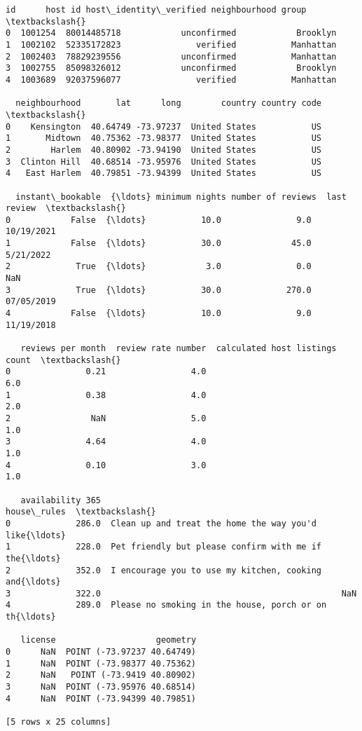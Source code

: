 \documentclass[11pt]{article}
\makeatletter
\newcommand{\boxspacing}{\kern\kvtcb@left@rule\kern\kvtcb@boxsep}
\newcommand{\prompt}[4]{
        {\ttfamily\llap{{\color{#2}[#3]:\hspace{3pt}#4}}\vspace{-\baselineskip}}
    }
\makeatother
\begin{document}
            \begin{tcolorbox}[breakable, size=fbox, boxrule=.5pt, pad at break*=1mm, opacityfill=0]
\prompt{Out}{outcolor}{12}{\boxspacing}
\begin{Verbatim}[commandchars=\\\{\}]
        id      host id host\_identity\_verified neighbourhood group  \textbackslash{}
0  1001254  80014485718            unconfirmed            Brooklyn
1  1002102  52335172823               verified           Manhattan
2  1002403  78829239556            unconfirmed           Manhattan
3  1002755  85098326012            unconfirmed            Brooklyn
4  1003689  92037596077               verified           Manhattan

  neighbourhood       lat      long        country country code  \textbackslash{}
0    Kensington  40.64749 -73.97237  United States           US
1       Midtown  40.75362 -73.98377  United States           US
2        Harlem  40.80902 -73.94190  United States           US
3  Clinton Hill  40.68514 -73.95976  United States           US
4   East Harlem  40.79851 -73.94399  United States           US

  instant\_bookable  {\ldots} minimum nights number of reviews  last review  \textbackslash{}
0            False  {\ldots}           10.0               9.0   10/19/2021
1            False  {\ldots}           30.0              45.0    5/21/2022
2             True  {\ldots}            3.0               0.0          NaN
3             True  {\ldots}           30.0             270.0   07/05/2019
4            False  {\ldots}           10.0               9.0   11/19/2018

   reviews per month  review rate number  calculated host listings count  \textbackslash{}
0               0.21                 4.0                             6.0
1               0.38                 4.0                             2.0
2                NaN                 5.0                             1.0
3               4.64                 4.0                             1.0
4               0.10                 3.0                             1.0

   availability 365                                        house\_rules  \textbackslash{}
0             286.0  Clean up and treat the home the way you'd like{\ldots}
1             228.0  Pet friendly but please confirm with me if the{\ldots}
2             352.0  I encourage you to use my kitchen, cooking and{\ldots}
3             322.0                                                NaN
4             289.0  Please no smoking in the house, porch or on th{\ldots}

   license                    geometry
0      NaN  POINT (-73.97237 40.64749)
1      NaN  POINT (-73.98377 40.75362)
2      NaN   POINT (-73.9419 40.80902)
3      NaN  POINT (-73.95976 40.68514)
4      NaN  POINT (-73.94399 40.79851)

[5 rows x 25 columns]
\end{Verbatim}
\end{tcolorbox}
        
\end{document}
